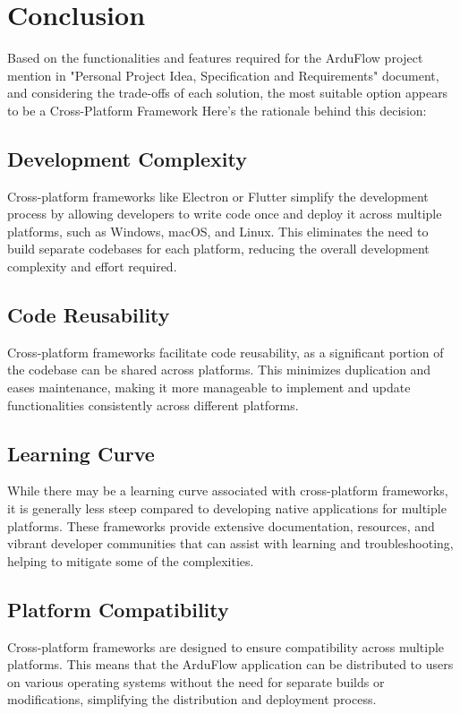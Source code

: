 \documentclass[a4paper, 11pt]{article}
\begin{document}
\section{Conclusion}
Based on the functionalities and features required for the ArduFlow project mention in "Personal Project Idea, Specification and Requirements" document, and considering the trade-offs of each solution, the most suitable option appears to be a Cross-Platform Framework Here's the rationale behind this decision:

\subsection{Development Complexity}
Cross-platform frameworks like Electron or Flutter simplify the development process by allowing developers to write code once and deploy it across multiple platforms, such as Windows, macOS, and Linux. This eliminates the need to build separate codebases for each platform, reducing the overall development complexity and effort required.

\subsection{Code Reusability}
Cross-platform frameworks facilitate code reusability, as a significant portion of the codebase can be shared across platforms. This minimizes duplication and eases maintenance, making it more manageable to implement and update functionalities consistently across different platforms.

\subsection{Learning Curve}
While there may be a learning curve associated with cross-platform frameworks, it is generally less steep compared to developing native applications for multiple platforms. These frameworks provide extensive documentation, resources, and vibrant developer communities that can assist with learning and troubleshooting, helping to mitigate some of the complexities.

\subsection{Platform Compatibility}
Cross-platform frameworks are designed to ensure compatibility across multiple platforms. This means that the ArduFlow application can be distributed to users on various operating systems without the need for separate builds or modifications, simplifying the distribution and deployment process.

\pagebreak
\end{document}
